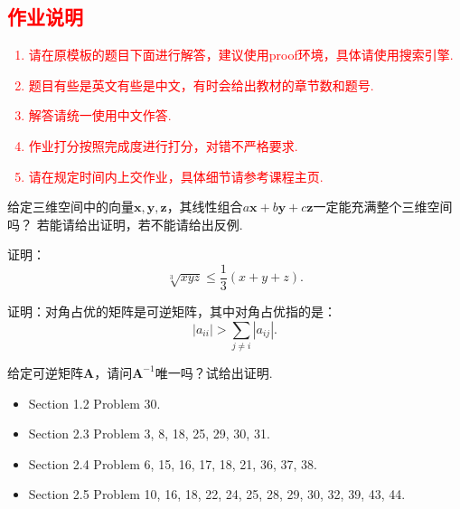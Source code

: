 \documentclass{oxmathproblems}
\begin{document}
\textcolor{red}{
\section*{作业说明}
\begin{enumerate}
  \item 请在原模板的题目下面进行解答，建议使用proof环境，具体请使用搜索引擎.
  \item 题目有些是英文有些是中文，有时会给出教材的章节数和题号.
  \item 解答请统一使用中文作答.
  \item 作业打分按照完成度进行打分，对错不严格要求.
  \item 请在规定时间内上交作业，具体细节请参考课程主页.
\end{enumerate}
}
\newpage



\begin{questions}

\miquestion 
给定三维空间中的向量$\bm{x}, \bm{y}, \bm{z}$，其线性组合$a\bm{x} + b\bm{y} + c \bm{z}$一定能充满整个三维空间吗？
若能请给出证明，若不能请给出反例.

\miquestion
证明：
$$
\sqrt[3]{xyz} \leq \frac{1}{3} (x + y + z).
$$

\miquestion
证明：对角占优的矩阵是可逆矩阵，其中对角占优指的是：
$$
|a_{ii}| > \sum_{j \neq i } |a_{ij}|.
$$


\miquestion 
给定可逆矩阵$\bm{A}$，请问$\bm{A}^{-1}$唯一吗？试给出证明.


\miquestion
\begin{itemize}
  \item Section 1.2 Problem 30.
  \item Section 2.3 Problem 3, 8, 18, 25, 29, 30, 31.
  \item Section 2.4 Problem 6, 15, 16, 17, 18, 21, 36, 37, 38.
  \item Section 2.5 Problem 10, 16, 18, 22, 24, 25, 28, 29, 30, 32, 39, 43, 44.
\end{itemize}



\end{questions}
\end{document}
